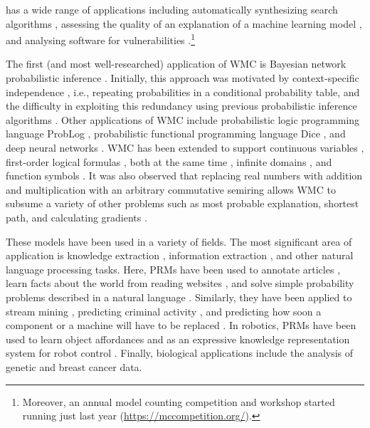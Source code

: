 has a wide range of applications including automatically synthesizing search algorithms \citep{DBLP:journals/corr/abs-2009-10877}, assessing the quality of an explanation of a machine learning model \citep{DBLP:conf/sat/NarodytskaSMIM19}, and analysing software for vulnerabilities \citep{DBLP:conf/sp/ZhouQRZ18}.\footnote{Moreover, an annual model counting competition and workshop started running just last year (\url{https://mccompetition.org/}).}

The first (and most well-researched)
application of WMC is Bayesian network probabilistic inference
\citep{DBLP:conf/ecai/BartKLM16,DBLP:conf/ijcai/ChaviraD05,DBLP:conf/sat/ChaviraD06,DBLP:conf/kr/Darwiche02,DBLP:conf/aaai/SangBK05}.
Initially, this approach was motivated by context-specific independence
\citep{DBLP:conf/uai/BoutilierFGK96}, i.e., repeating probabilities in a
conditional probability table, and the difficulty in exploiting this redundancy
using previous probabilistic inference algorithms
\citep{DBLP:conf/kr/Darwiche02}. Other applications of WMC include probabilistic
logic programming language ProbLog
\citep{DBLP:journals/tplp/FierensBRSGTJR15,DBLP:conf/aaai/VlasselaerKDMR16},
probabilistic functional programming language Dice
\citep{DBLP:journals/pacmpl/HoltzenBM20}, and deep neural networks
\citep{DBLP:conf/aaai/TsamouraHM21,DBLP:conf/icml/XuZFLB18}. WMC has been
extended to support continuous variables \citep{DBLP:conf/ijcai/BellePB15},
first-order logical formulas
\citep{DBLP:conf/ijcai/BroeckTMDR11,DBLP:journals/cacm/GogateD16}, both at the same time \citep{DBLP:conf/uai/FeldsteinB21}, infinite
domains \citep{DBLP:conf/aaai/Belle17}, and function symbols \citep{DBLP:conf/uai/Belle17}. It was also observed that replacing real
numbers with addition and multiplication with an arbitrary commutative semiring
allows WMC to subsume a variety of other problems such as most probable
explanation, shortest path, and calculating gradients
\citep{DBLP:journals/ijar/BelleR20,DBLP:journals/japll/KimmigBR17}.

These models have been used in a variety of fields. The most significant area of
application is knowledge extraction \citep{DBLP:conf/naacl/PoonV10}, information
extraction \citep{bunescu2007statistical}, and other natural language processing
tasks. Here, PRMs have been used to annotate articles
\citep{DBLP:conf/emnlp/VerbekeAMFDR12}, learn facts about the world from reading
websites \citep{DBLP:conf/aaai/CarlsonBKSHM10}, and solve simple probability
problems described in a natural language \citep{DBLP:conf/ijcai/DriesKDBR17}.
Similarly, they have been applied to stream mining
\citep{DBLP:conf/icdm/ChandraSKTA14}, predicting criminal activity
\citep{DBLP:conf/sdm/DelaneyFCWJ10}, and predicting how soon a component or a
machine will have to be replaced \citep{vlasselaer2012statistical}. In robotics,
PRMs have been used to learn object affordances
\citep{DBLP:conf/ilp/MoldovanORMS11,DBLP:conf/icra/MoldovanMOSR12,DBLP:conf/iros/MoldovanR14}
and as an expressive knowledge representation system for robot control
\citep{DBLP:conf/icra/JainMB09}. Finally, biological applications include the
analysis of genetic \citep{DBLP:journals/jcb/SakhanenkoG12} and breast cancer
\citep{DBLP:conf/ilp/Corte-RealD017,DBLP:conf/pkdd/NassifKBPSC13} data.
